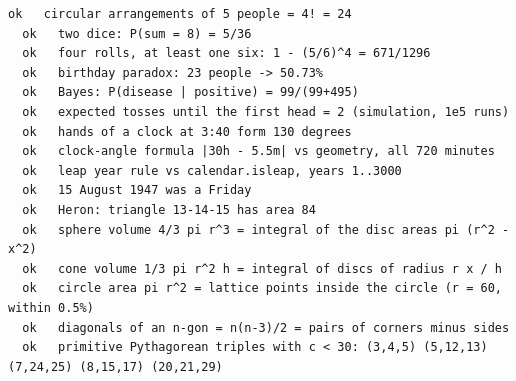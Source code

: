 \documentclass[10pt,a4paper,openany,oneside]{report}
\begin{document}
\begin{lstlisting}[style=out,basicstyle=\ttfamily\fontsize{7.2}{8.6}\selectfont,title={48 formula checks}]
  ok   circular arrangements of 5 people = 4! = 24
  ok   two dice: P(sum = 8) = 5/36
  ok   four rolls, at least one six: 1 - (5/6)^4 = 671/1296
  ok   birthday paradox: 23 people -> 50.73%
  ok   Bayes: P(disease | positive) = 99/(99+495)
  ok   expected tosses until the first head = 2 (simulation, 1e5 runs)
  ok   hands of a clock at 3:40 form 130 degrees
  ok   clock-angle formula |30h - 5.5m| vs geometry, all 720 minutes
  ok   leap year rule vs calendar.isleap, years 1..3000
  ok   15 August 1947 was a Friday
  ok   Heron: triangle 13-14-15 has area 84
  ok   sphere volume 4/3 pi r^3 = integral of the disc areas pi (r^2 - x^2)
  ok   cone volume 1/3 pi r^2 h = integral of discs of radius r x / h
  ok   circle area pi r^2 = lattice points inside the circle (r = 60, within 0.5%)
  ok   diagonals of an n-gon = n(n-3)/2 = pairs of corners minus sides
  ok   primitive Pythagorean triples with c < 30: (3,4,5) (5,12,13) (7,24,25) (8,15,17) (20,21,29)
\end{lstlisting}
\end{document}

